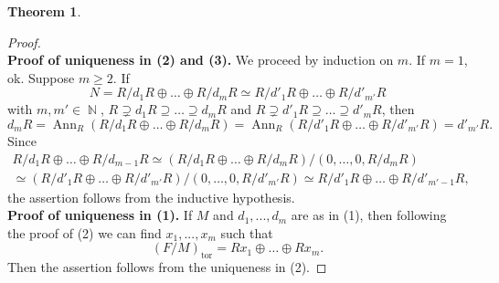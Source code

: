 \documentclass[12pt,a4paper]{report}
\theoremstyle{definition}
\newtheorem{theorem}{Theorem}[chapter] %
\theoremstyle{num.custom-title}
\DeclareMathOperator{\tor}{tor}
\DeclareMathOperator{\Ann}{Ann}
\DeclareMathOperator{\N}{\mathbb{N}}
\begin{document}
\begin{theorem}
\begin{proof}
\\[6pt]
\textbf{Proof of uniqueness in (2) and (3).} We proceed by induction on $m$. If $m=1$, ok. Suppose $m \geq 2$. If 
\[
N = R/d_1 R \oplus \ldots \oplus R/d_m R \simeq R/d'_1 R \oplus \ldots \oplus R/d'_{m'} R
\]
with $m,m' \in \N$, $R \supsetneq d_1 R \supseteq \ldots \supseteq d_m R$ and $R \supsetneq d'_1 R \supseteq \ldots \supseteq d'_m R$, then 
\[
d_m R = \Ann_R(R/d_1 R \oplus \ldots \oplus R/d_m R) = \Ann_R (R/d'_1 R \oplus \ldots \oplus R/d'_{m'} R) = d'_{m'}R.
\]
Since 
\begin{multline*}
R/d_1 R \oplus \ldots \oplus R/d_{m-1} R \simeq (R/d_1 R \oplus \ldots \oplus R/d_m R)/(0,\ldots,0,R/d_m R) \\ 
\simeq (R/d'_1 R \oplus \ldots \oplus R/d'_{m'} R)/(0,\ldots,0,R/d'_{m'} R) \simeq R/d'_1 R \oplus \ldots \oplus R/d'_{m'-1} R,
\end{multline*}
the assertion follows from the inductive hypothesis.
\\[6pt]
\textbf{Proof of uniqueness in (1).} If $M$ and $d_1,...,d_m$ are as in (1), then following the proof of (2) we can find $x_1,...,x_m$ such that
\[
(F/M)_{\tor} = R x_1 \oplus \ldots \oplus R x_m.
\]
Then the assertion follows from the uniqueness in (2).
\end{proof}
\end{theorem}
\end{document}
